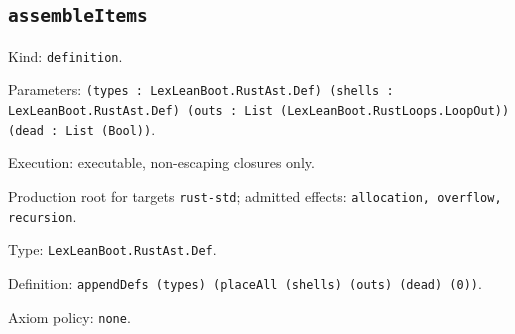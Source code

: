 \documentclass[11pt]{article}
\begin{document}
\subsection*{\texttt{assembleItems}}
\noindent Kind: \texttt{definition}.\par
\noindent Parameters: \texttt{(types : LexLeanBoot.RustAst.Def) (shells : LexLeanBoot.RustAst.Def) (outs : List (LexLeanBoot.RustLoops.LoopOut)) (dead : List (Bool))}.\par
\noindent Execution: executable, non-escaping closures only.\par
\noindent Production root for targets \texttt{rust-std}; admitted effects: \texttt{allocation, overflow, recursion}.\par
\noindent Type: \texttt{LexLeanBoot.RustAst.Def}.\par
\noindent Definition: \texttt{appendDefs (types) (placeAll (shells) (outs) (dead) (0))}.\par
\noindent Axiom policy: \texttt{none}.\par
\end{document}
